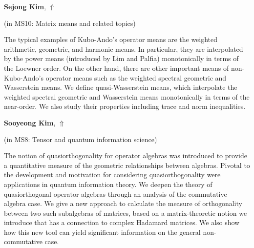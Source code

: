 \documentclass[ILAS2025-program.tex]{subfiles}
\begin{document}
\hypertarget{down0023}{}\begin{ilasabstract}
    
\textbf{Sejong Kim},  \hfill \hyperlink{up0023}{$\Uparrow$}
    
    
(in {\color{mstitle}MS10: Matrix means and related topics})
        
\mtskip
    The typical examples of Kubo-Ando's operator means are the weighted arithmetic, geometric, and harmonic means. In particular, they are interpolated by the power means (introduced by Lim and Palfia) monotonically in terms of the Loewner order. On the other hand, there are other important means of non-Kubo-Ando's operator means such as the weighted spectral geometric and Wasserstein means. We define quasi-Wasserstein means, which interpolate the weighted spectral geometric and Wasserstein means monotonically in terms of the near-order. We also study their properties including trace and norm inequalities.

\end{ilasabstract}
    

\hypertarget{down0283}{}\begin{ilasabstract}
    
\textbf{Sooyeong Kim},  \hfill \hyperlink{up0283}{$\Uparrow$}
    
    
(in {\color{mstitle}MS8: Tensor and quantum information science})
        
\mtskip
    The notion of quasiorthogonality for operator algebras was introduced to provide a quantitative measure of the geometric relationships between algebras. Pivotal to the development and motivation for considering quasiorthogonality were applications in quantum information theory. We deepen the theory of quasiorthogonal operator algebras through an analysis of the commutative algebra case. We give a new approach to calculate the measure of orthogonality between two such subalgebras of matrices, based on a matrix-theoretic notion we introduce that has a connection to complex Hadamard matrices. We also show how this new tool can yield significant information on the general non-commutative case.

\end{ilasabstract}
    
\end{document}
